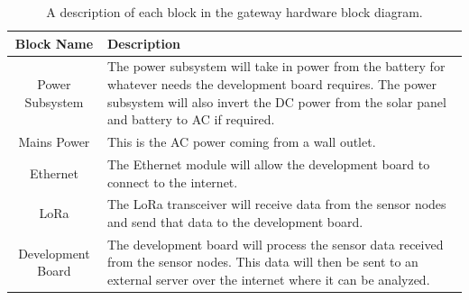 \documentclass[titlepage, 11pt, letterpaper]{article}
\begin{document}
\begin{table}[H]
    \centering
    \caption{A description of each block in the gateway hardware block diagram.}
    \begin{tabularx}{\linewidth}{|c|X|}
        \hline
        Block Name & Description \\ 
        \hline
        Power Subsystem & The power subsystem will take in power from the battery for whatever needs the development board requires. The power subsystem will also invert the DC power from the solar panel and battery to AC if required. \\\hline
        Mains Power & This is the AC power coming from a wall outlet. \\\hline
        Ethernet & The Ethernet module will allow the development board to connect to the internet. \\\hline
        LoRa & The LoRa transceiver will receive data from the sensor nodes and send that data to the development board. \\\hline
        Development Board & The development board will process the sensor data received from the sensor nodes. This data will then be sent to an external server over the internet where it can be analyzed. \\\hline
    \end{tabularx}
    \label{tab:descHWBaseStationBD}
\end{table}
\end{document}
